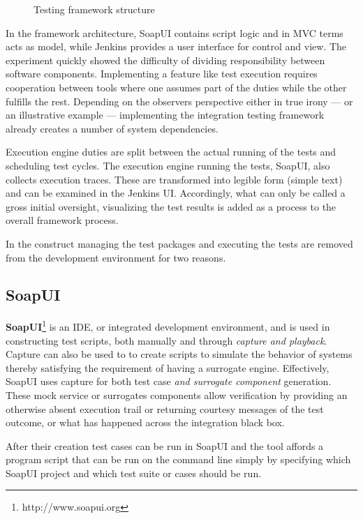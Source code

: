 \documentclass[12pt,a4paper,oneside,pdftex]{report}
\begin{document}
{\begin{figure}[H]
\begin{tikzpicture}[
    start chain=going below,    %
    node distance=8mm and 50mm, %
    ]
\end{tikzpicture}
\caption{Testing framework structure} \label{fig:structure}
\end{figure}

In the framework architecture, SoapUI contains script logic and in MVC terms acts as model, while Jenkins provides a user interface for control and view. The experiment quickly showed the difficulty of dividing responsibility between software components. Implementing a feature like test execution requires cooperation between tools where one assumes part of the duties while the other fulfills the rest. Depending on the observers perspective either in true irony --- or an illustrative example --- implementing the integration testing framework already creates a number of system dependencies.

Execution engine duties are split between the actual running of the tests and scheduling test cycles. The execution engine running the tests, SoapUI, also collects execution traces. These are transformed into legible form (simple text) and can be examined in the Jenkins UI. Accordingly, what can only be called a gross initial oversight, visualizing the test results is added as a process to the overall framework process.

In the construct managing the test packages and executing the tests are removed from the development environment for two reasons.


\subsection{SoapUI}

\textbf{SoapUI}\footnote{http://www.soapui.org} is an IDE, or integrated development environment, and is used in constructing test scripts, both manually and through \emph{capture and playback}. Capture can also be used to to create scripts to simulate the behavior of systems thereby satisfying the requirement of having a surrogate engine. Effectively, SoapUI uses capture for both test case \emph{and surrogate component} generation. These mock service or surrogates components allow verification by providing an otherwise absent execution trail or returning courtesy messages of the test outcome, or what has happened across the integration black box.

After their creation test cases can be run in SoapUI and the tool affords a program script that can be run on the command line simply by specifying which SoapUI project and which test suite or cases should be run.

}
\end{document}
